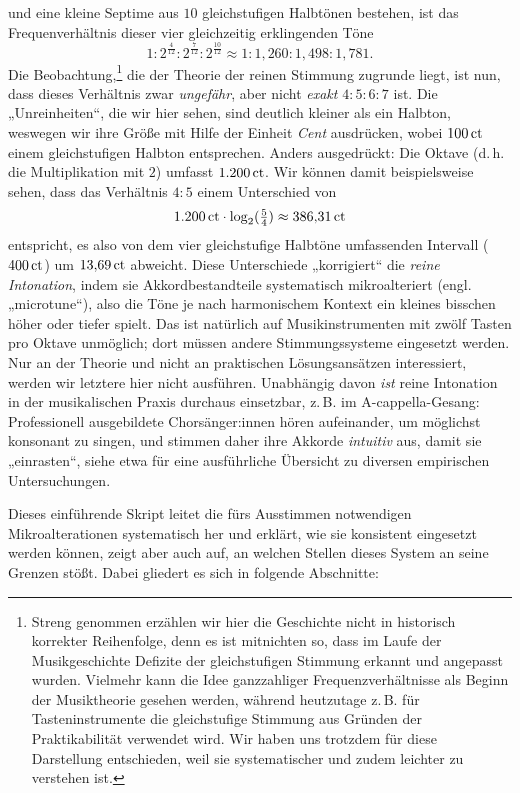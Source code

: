 und eine kleine Septime aus $10$ gleichstufigen Halbtönen bestehen, ist das
Frequenverhältnis dieser vier gleichzeitig erklingenden Töne %
\[1:2^{\frac4{12}}:2^{\frac7{12}}:2^{\frac{10}{12}}\approx
  1:1{,}260:1{,}498:1{,}781.\]%
Die Beobachtung,\footnote{Streng genommen erzählen wir hier die Geschichte nicht
  in historisch korrekter Reihenfolge, denn es ist mitnichten so, dass im Laufe
  der Musikgeschichte Defizite der gleichstufigen Stimmung erkannt und angepasst
  wurden. Vielmehr kann die Idee ganzzahliger Frequenzverhältnisse als Beginn
  der Musiktheorie gesehen werden, während heutzutage z.\,B. für
  Tasteninstrumente die gleichstufige Stimmung aus Gründen der Praktikabilität
  verwendet wird. Wir haben uns trotzdem für diese Darstellung entschieden, weil
  sie systematischer und zudem leichter zu verstehen ist.} die der Theorie der
reinen Stimmung zugrunde liegt, ist nun, dass dieses Verhältnis zwar
\emph{ungefähr}, aber nicht \emph{exakt} $4:5:6:7$ ist. Die „Unreinheiten“, die
wir hier sehen, sind deutlich kleiner als ein Halbton, weswegen wir ihre
Größe mit Hilfe der Einheit \emph{Cent} ausdrücken, wobei $100\,\text{ct}$ einem
gleichstufigen Halbton entsprechen. Anders ausgedrückt: Die Oktave (d.\,h. die
Multiplikation mit $2$) umfasst $1{.}200\,\text{ct}$. Wir können damit
beispielsweise sehen, dass das Verhältnis $4:5$ einem Unterschied von
\[1{.}200\,\text{ct}\cdot \log_2(\tfrac54) \approx 386{,}31\,\text{ct}\]%
entspricht, es also von dem vier gleichstufige Halbtöne umfassenden Intervall
($400\,\text{ct}$) um $13{,}69\,\text{ct}$ abweicht. Diese Unterschiede „korrigiert“ die
\emph{reine Intonation}, indem sie Akkordbestandteile systematisch
mikroalteriert (engl. „microtune“), also die Töne je nach harmonischem Kontext
ein kleines bisschen höher oder tiefer spielt. Das ist natürlich auf
Musikinstrumenten mit zwölf Tasten pro Oktave unmöglich; dort müssen andere
Stimmungssysteme eingesetzt werden. Nur an der Theorie und nicht an praktischen
Lösungsansätzen interessiert, werden wir letztere hier nicht
ausführen. Unabhängig davon \emph{ist} reine Intonation in der musikalischen
Praxis durchaus einsetzbar, z.\,B. im A-cappella-Gesang: Professionell
ausgebildete Chorsänger:innen hören aufeinander, um möglichst konsonant zu
singen, und stimmen daher ihre Akkorde \emph{intuitiv} aus, damit sie
„einrasten“, siehe etwa \cite[§\,2.4]{Maria} für eine ausführliche Übersicht zu
diversen empirischen Untersuchungen.

Dieses einführende Skript leitet die fürs Ausstimmen notwendigen
Mikroalterationen systematisch her und erklärt, wie sie konsistent eingesetzt
werden können, zeigt aber auch auf, an welchen Stellen dieses System an seine
Grenzen stößt. Dabei gliedert es sich in folgende Abschnitte:

